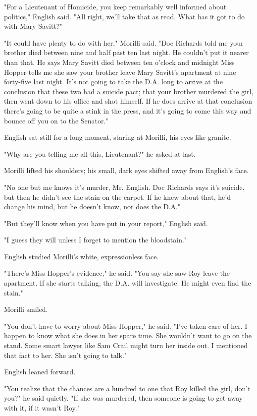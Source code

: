 \documentclass{novel}
\begin{document}
"For a Lieutenant of Homicide, you keep remarkably well informed about politics," English said. "All right, we'll take that as read. What has it got to do with Mary Savitt?"

"It could have plenty to do with her," Morilli said. "Doc Richards told me your brother died between nine and half past ten last night. He couldn't put it nearer than that. He says Mary Savitt died between ten o'clock and midnight Miss Hopper tells me she saw your brother leave Mary Savitt's apartment at nine forty-five last night. It's not going to take the D.A. long to arrive at the conclusion that these two had a suicide pact; that your brother murdered the girl, then went down to his office and shot himself. If he does arrive at that conclusion there's going to be quite a stink in the press, and it's going to come this way and bounce off you on to the Senator."

English sat still for a long moment, staring at Morilli, his eyes like granite.

"Why are you telling me all this, Lieutenant?" he asked at last.

Morilli lifted his shoulders; his small, dark eyes shifted away from English's face.

"No one but me knows it's murder, Mr. English. Doc Richards says it's suicide, but then he didn't see the stain on the carpet. If he knew about that, he'd change his mind, but he doesn't know, nor does the D.A."

"But they'll know when you have put in your report," English said.

"I guess they will unless I forget to mention the bloodstain."

English studied Morilli's white, expressionless face.

"There's Miss Hopper's evidence," he said. "You say she saw Roy leave the apartment. If she starts talking, the D.A. will investigate. He might even find the stain."

Morilli smiled.

"You don't have to worry about Miss Hopper," he said. "I've taken care of her. I happen to know what she does in her spare time. She wouldn't want to go on the stand. Some smart lawyer like Sam Crail might turn her inside out. I mentioned that fact to her. She isn't going to talk."

English leaned forward.

"You realize that the chances are a hundred to one that Roy killed the girl, don't you?" he said quietly. "If she was murdered, then someone is going to get away with it, if it wasn't Roy."
\end{document}
